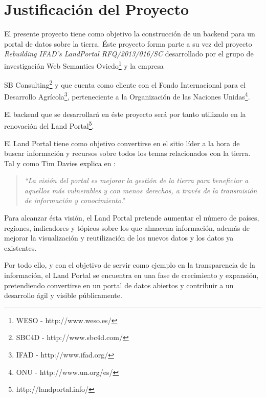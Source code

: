 \section{Justificación del Proyecto}
El presente proyecto tiene como objetivo la construcción de un backend para un portal de datos sobre la tierra.  Éste proyecto forma parte a su vez del proyecto \textit{Rebuilding IFAD's LandPortal RFQ/2013/016/SC} desarrollado por el grupo de investigación Web Semantics Oviedo\footnote{WESO - http://www.weso.es/} y la empresa {SB Consulting\footnote{SBC4D - http://www.sbc4d.com/} y que cuenta como cliente con el Fondo Internacional para el Desarrollo Agrícola\footnote{IFAD - http://www.ifad.org/}, perteneciente a la Organización de las Naciones Unidas\footnote{ONU - http://www.un.org/es/}.

El backend que se desarrollará en éste proyecto será por tanto utilizado en la renovación del Land Portal\footnote{http://landportal.info/}.

El Land Portal tiene como objetivo convertirse en el sitio líder a la hora de buscar información y recursos sobre todos los temas relacionados con la tierra. Tal y como Tim Davies explica en :
\begin{quote}
\textit{``La visión del portal es mejorar la gestión de la tierra para beneficiar a aquellos más vulnerables y con menos derechos, a través de la transmisión de información y conocimiento}.''
\end{quote}

Para alcanzar ésta visión, el Land Portal pretende aumentar el número de países, regiones, indicadores y tópicos sobre los que almacena información, además de mejorar la visualización y reutilización de los nuevos datos y los datos ya existentes.

Por todo ello, y con el objetivo de servir como ejemplo en la transparencia de la información, el Land Portal se encuentra en una fase de crecimiento y expansión, pretendiendo convertirse en un portal de datos abiertos y contribuir a un desarrollo ágil y visible públicamente.



}
